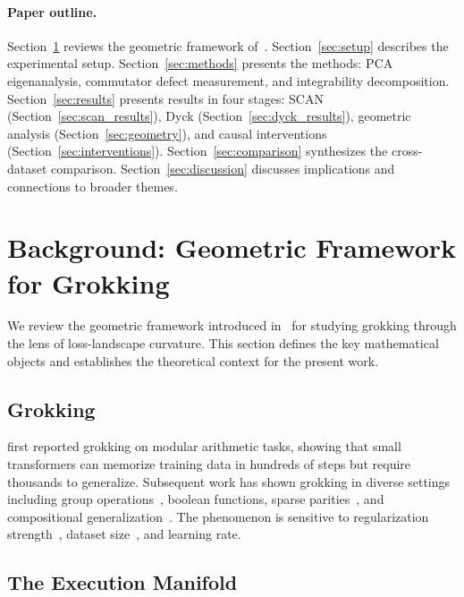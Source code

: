 \documentclass[11pt]{article}
\begin{document}
\paragraph{Paper outline.} Section~\ref{sec:background} reviews the geometric framework of~\citet{xu2026integrability}. Section~\ref{sec:setup} describes the experimental setup. Section~\ref{sec:methods} presents the methods: PCA eigenanalysis, commutator defect measurement, and integrability decomposition. Section~\ref{sec:results} presents results in four stages: SCAN (Section~\ref{sec:scan_results}), Dyck (Section~\ref{sec:dyck_results}), geometric analysis (Section~\ref{sec:geometry}), and causal interventions (Section~\ref{sec:interventions}). Section~\ref{sec:comparison} synthesizes the cross-dataset comparison. Section~\ref{sec:discussion} discusses implications and connections to broader themes.


\section{Background: Geometric Framework for Grokking}
\label{sec:background}

We review the geometric framework introduced in~\citet{xu2026integrability} for studying grokking through the lens of loss-landscape curvature. This section defines the key mathematical objects and establishes the theoretical context for the present work.

\subsection{Grokking}

\citet{power2022grokking} first reported grokking on modular arithmetic tasks, showing that small transformers can memorize training data in hundreds of steps but require thousands to generalize. Subsequent work has shown grokking in diverse settings including group operations~\citep{nanda2023progress}, boolean functions, sparse parities~\citep{barak2022hidden}, and compositional generalization~\citep{murty2023grokking}. The phenomenon is sensitive to regularization strength~\citep{liu2022omnigrok}, dataset size~\citep{liu2023grokking}, and learning rate.

\subsection{The Execution Manifold}
\label{sec:execution_manifold}
\end{document}
